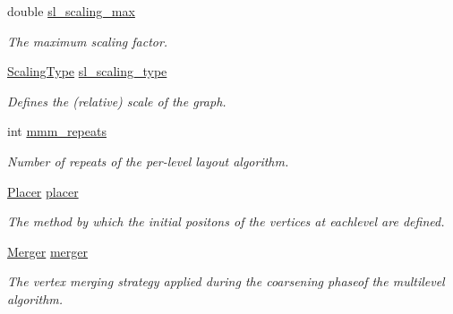 \begin{DoxyCompactItemize}
double \hyperlink{structLayoutConfiguration_a96f6f38497727a3844acab6be2ae021a}{sl\+\_\+scaling\+\_\+max}
\begin{DoxyCompactList}\small\item\em The maximum scaling factor. \end{DoxyCompactList}\item 
\mbox{\label{structLayoutConfiguration_a7975f6fe7f0ca315af9c631a325b98af}} 
\hyperlink{layout_8hh_ae327227c361ab0e868a1f25017cb3ae2}{Scaling\+Type} \hyperlink{structLayoutConfiguration_a7975f6fe7f0ca315af9c631a325b98af}{sl\+\_\+scaling\+\_\+type}
\begin{DoxyCompactList}\small\item\em Defines the (relative) scale of the graph. \end{DoxyCompactList}\item 
\mbox{\label{structLayoutConfiguration_a73bfc92692894cafdfa063b0a45bc065}} 
int \hyperlink{structLayoutConfiguration_a73bfc92692894cafdfa063b0a45bc065}{mmm\+\_\+repeats}
\begin{DoxyCompactList}\small\item\em Number of repeats of the per-\/level layout algorithm. \end{DoxyCompactList}\item 
\mbox{\label{structLayoutConfiguration_a139a9d88f1bcce6769b440f0f49130f0}} 
\hyperlink{layout_8hh_a93e50260439be3f5fe75b271c0ce2c96}{Placer} \hyperlink{structLayoutConfiguration_a139a9d88f1bcce6769b440f0f49130f0}{placer}
\begin{DoxyCompactList}\small\item\em The method by which the initial positons of the vertices at eachlevel are defined. \end{DoxyCompactList}\item 
\mbox{\label{structLayoutConfiguration_a70222497c34b2ffa597cd364d0a1d318}} 
\hyperlink{layout_8hh_a87e3986b1a6733e81a1c0b4bbd6aba18}{Merger} \hyperlink{structLayoutConfiguration_a70222497c34b2ffa597cd364d0a1d318}{merger}
\begin{DoxyCompactList}\small\item\em The vertex merging strategy applied during the coarsening phaseof the multilevel algorithm. \end{DoxyCompactList}\item 

\end{DoxyCompactItemize}
